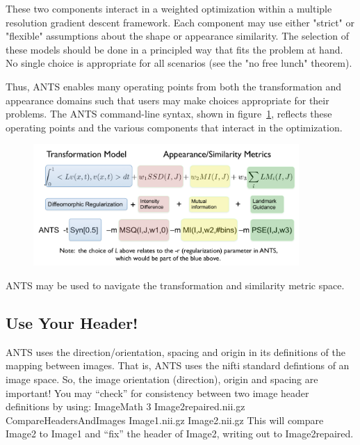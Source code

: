 \documentclass{InsightArticle}
\begin{document}
These two components interact in a weighted optimization within a multiple resolution gradient descent framework. Each component may use either "strict" or "flexible" assumptions about the shape or appearance similarity. The selection of these models should be done in a principled way that fits the problem at hand. No single choice is appropriate for all scenarios (see the "no free lunch" theorem). 

Thus, ANTS enables many operating points from both the transformation and appearance domains such that users may make choices appropriate for their problems. The ANTS command-line syntax, shown in figure~\ref{fig:cmd}, reflects these operating points and the various components that interact in the optimization.
\begin{figure}
\label{fig:cmd}
\includegraphics[width=0.9\textwidth]{Figures/ANTSSyntax.pdf} 
\vspace{-0.1in}
\end{figure}
ANTS may be used to navigate the transformation and similarity metric space. 
\subsection{Use Your Header!} ANTS uses the direction/orientation, spacing
and origin in its definitions of the mapping between images.  That is,
ANTS uses the nifti standard defintions of an image space.  So, the
image orientation (direction), origin and spacing are important!  You
may ``check'' for consistency between two image header definitions by
using: ImageMath 3 Image2repaired.nii.gz CompareHeadersAndImages
Image1.nii.gz Image2.nii.gz \newline This will compare Image2 to
Image1 and ``fix'' the header of Image2, writing out to
Image2repaired.
\end{document}

